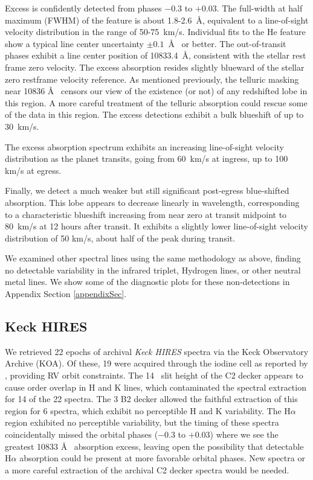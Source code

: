 \documentclass[twocolumn]{aastex631}
\begin{document}
Excess is confidently detected from phases $-$0.3 to $+$0.03.  The full-width at half maximum (FWHM) of the feature is about 1.8-2.6~\AA, equivalent to a line-of-sight velocity distribution in the range of 50-75~km/s.  Individual fits to the He feature show a typical line center uncertainty $\pm0.1$~\AA~ or better.  The out-of-transit phases exhibit a line center position of 10833.4~\AA, consistent with the stellar  rest frame zero velocity.  The excess absorption resides slightly blueward of the stellar zero restframe velocity reference.  As mentioned previously, the telluric masking near 10836 \AA~ censors our view of the existence (or not) of any redshifted lobe in this region.  A more careful treatment of the telluric absorption could rescue some of the data in this region.  The excess detections exhibit a bulk blueshift of up to 30~km/s.

The excess absorption spectrum exhibits an increasing line-of-sight velocity distribution as the planet transits, going from 60~km/s at ingress, up to 100 km/s at egress.

Finally, we detect a much weaker but still significant post-egress blue-shifted absorption.  This lobe appears to decrease linearly in wavelength, corresponding to a characteristic blueshift increasing from near zero at transit midpoint to 80~km/s at 12 hours after transit.  It exhibits a slightly lower line-of-sight velocity distribution of 50 km/s, about half of the peak during transit.

We examined other spectral lines using the same methodology as above, finding no detectable variability in the  infrared triplet, Hydrogen lines, or other neutral metal lines.  We show some of the diagnostic plots for these non-detections in Appendix Section \ref{appendixSec}.



\subsection{Keck HIRES}
We retrieved 22 epochs of archival \emph{Keck HIRES} spectra via the Keck Observatory Archive (KOA). Of these, 19 were acquired through the iodine cell as reported by \citet{2017AJ....153..211Z}, providing RV orbit constraints.  The 14\arcsec~ slit height of the C2 decker appears to cause order overlap in  H and K lines, which contaminated the spectral extraction for 14 of the 22 spectra.  The 3 B2 decker allowed the faithful extraction of this region for 6 spectra, which exhibit no perceptible  H and K variability.  The H$\alpha$ region exhibited no perceptible variability, but the timing of these spectra coincidentally missed the orbital phases ($-0.3$ to $+0.03$) where we see the greatest  10833 \AA~ absorption excess, leaving open the possibility that detectable H$\alpha$ absorption could be present at more favorable orbital phases.  New spectra or a more careful extraction of the archival C2 decker spectra would be needed.
\end{document}
